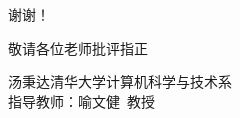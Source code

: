\documentclass[aspectratio=169,10pt]{beamer}
\begin{document}
{
\begin{frame}
\centering
\vspace{2em}
{\Huge\color{thupurple} 谢谢！}

\vspace{1.5em}
{\Large 敬请各位老师批评指正}

\vspace{2em}
{\normalsize 汤秉达\quad 清华大学计算机科学与技术系}\\[0.3em]
{\normalsize 指导教师：喻文健\ 教授}
\end{frame}
}
\end{document}

